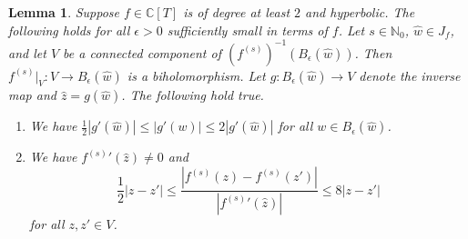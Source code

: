 \documentclass[10pt,a4paper]{amsart}
\newcommand{\varw}{z}
\newcommand{\varz}{w}
\newtheorem{lemma}{Lemma}
\newcommand{\IC}{\mathbb{C}}
\newcommand{\IN}{\mathbb{N}}
\begin{document}
\begin{lemma}
  \label{lem:fninvuniform_new1}
  Suppose $f\in\IC[T]$ is of degree at least $2$ and
  hyperbolic. The following holds for all $\epsilon > 0$  sufficiently small in terms of
  $f$. Let
  $s\in\IN_0$, $\widehat w\in J_{f}$, and let
  $V$ be a connected component of $(f^{(s)})^{-1}(B_{\epsilon}(\widehat{w}))$.
  Then $f^{(s)}|_V\colon V\rightarrow B_{\epsilon}(\widehat{w})$ is
  a biholomorphism.
  Let $g\colon
  B_{\epsilon}(\widehat{\varz})\rightarrow V$ denote the inverse map and
  $\widehat z = g(\widehat w)$. The following hold true.
  \begin{enumerate}
  \item[(i)] 
    We have $\frac 12 |g'(\widehat w)|\le |g'(w)|\le 2|g'(\widehat w)|$ for all $w\in
    B_{\epsilon}(\widehat w)$. 
  \item[(ii)]  
    We have ${f^{(s)}}'(\widehat{\varw})\not=0$ and
    \begin{equation*}
      \frac 12 |z-z'| \le \frac{|{f^{(s)}}(z)-{f^{(s)}}(z')|}{|{f^{(s)}}'(\widehat{\varw})|} \le 8 |z-z'|
    \end{equation*}
    for all $z,z'\in V$. 
  \end{enumerate}
\end{lemma}
\end{document}
